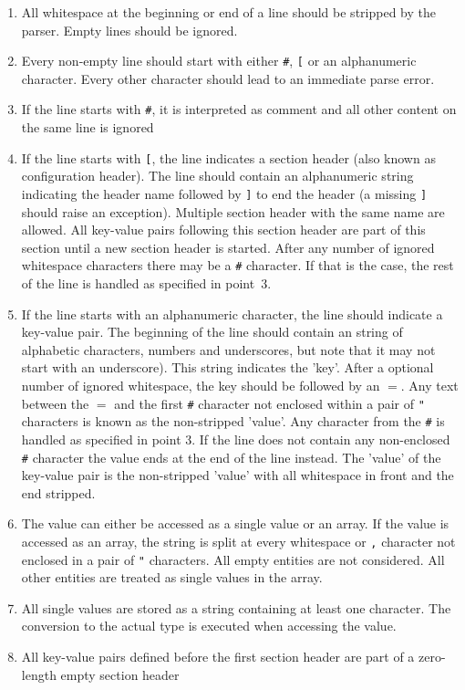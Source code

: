 \begin{enumerate}
\item All whitespace at the beginning or end of a line should be stripped by the parser. Empty lines should be ignored.
\item Every non-empty line should start with either \texttt{\#}, \texttt{[} or an alphanumeric character. Every other character should lead to an immediate parse error.
\item If the line starts with \texttt{\#}, it is interpreted as comment and all other content on the same line is ignored
\item If the line starts with \texttt{[}, the line indicates a section header (also known as configuration header). The line should contain an alphanumeric string indicating the header name followed by \texttt{]} to end the header (a missing \texttt{]} should raise an exception). Multiple section header with the same name are allowed. All key-value pairs following this section header are part of this section until a new section header is started. After any number of ignored whitespace characters there may be a \texttt{\#} character. If that is the case, the rest of the line is handled as specified in point~3.
\item If the line starts with an alphanumeric character, the line should indicate a key-value pair. The beginning of the line should contain an string of alphabetic characters, numbers and underscores, but note that it may not start with an underscore). This string indicates the 'key'. After a optional number of ignored whitespace, the key should be followed by an \texttt{$=$}. Any text between the \texttt{$=$} and the first \texttt{\#} character not enclosed within a pair of \texttt{"} characters is known as the non-stripped 'value'. Any character from the \texttt{\#} is handled as specified in point 3. If the line does not contain any non-enclosed \texttt{\#} character the value ends at the end of the line instead. The 'value' of the key-value pair is the non-stripped 'value' with all whitespace in front and the end stripped.
\item The value can either be accessed as a single value or an array. If the value is accessed as an array, the string is split at every whitespace or \texttt{,} character not enclosed in a pair of \texttt{"} characters. All empty entities are not considered. All other entities are treated as single values in the array.
\item All single values are stored as a string containing at least one character. The conversion to the actual type is executed when accessing the value.
\item All key-value pairs defined before the first section header are part of a zero-length empty section header
\end{enumerate}

